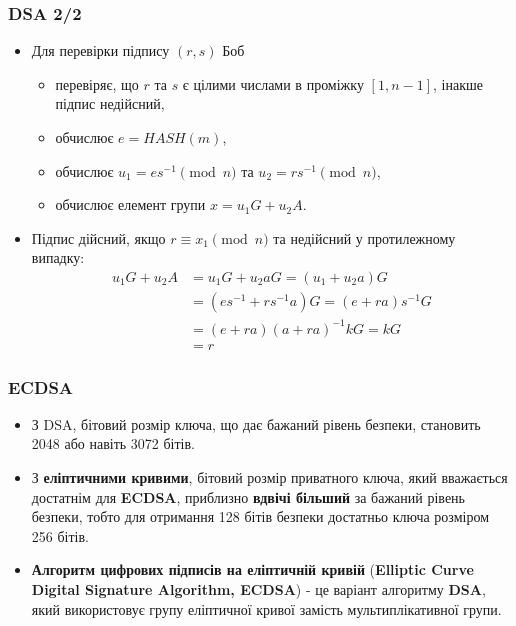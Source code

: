 \documentclass{beamer}
\begin{document}
\begin{frame}
  \frametitle{DSA 2/2}
  \begin{itemize}
  \item Для перевірки підпису $(r, s)$ Боб
    \begin{itemize}
    \item перевіряє, що $r$ та $s$ є цілими числами в проміжку $[1, n - 1]$,
      інакше підпис недійсний,
    \item обчислює $e = HASH(m)$,
    \item обчислює $u_1 = es^{-1} \pmod{n}$ та $u_2 = rs^{-1} \pmod{n}$,
    \item обчислює елемент групи $x = u_1G + u_2A$.
    \end{itemize}
  \item Підпис дійсний, якщо $r \equiv x_1 \pmod{n}$ та недійсний у протилежному
    випадку:
    \begin{align*}
      u_1G + u_2A &= u_1G + u_2aG = (u_1 + u_2a)G \\
                  &= (es^{-1} + rs^{-1}a)G = (e + ra)s^{-1}G \\
                  &= (e + ra)(a + ra)^{-1}kG = kG \\
                  &= r
    \end{align*}
  \end{itemize}
\end{frame}

\begin{frame}
  \frametitle{ECDSA}
  \begin{itemize}  
  \item З DSA, бітовий розмір ключа, що дає бажаний рівень безпеки, становить
    2048 або навіть 3072 бітів.
  \item З \textbf{еліптичними кривими}, бітовий розмір приватного ключа, який
    вважається достатнім для \textbf{ECDSA}, приблизно \textbf{вдвічі більший}
    за бажаний рівень безпеки, тобто для отримання 128 бітів безпеки достатньо
    ключа розміром 256 бітів.
  \item \textbf{Алгоритм цифрових підписів на еліптичній кривій}
    (\textbf{Elliptic Curve Digital Signature Algorithm, ECDSA}) - це варіант
    алгоритму \textbf{DSA}, який використовує групу еліптичної кривої замість
    мультиплікативної групи.
  \end{itemize}
\end{frame}
\end{document}
